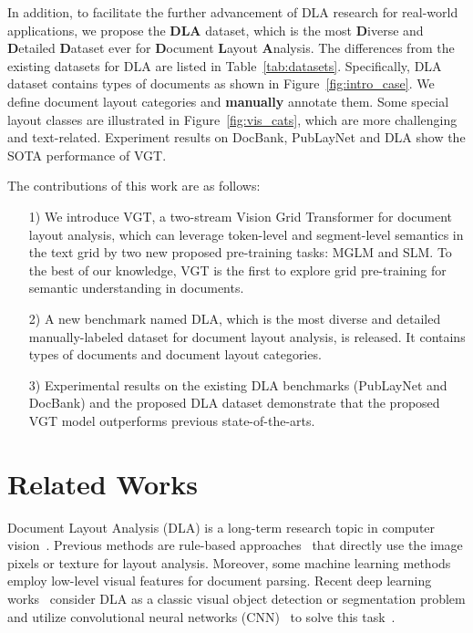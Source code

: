 \documentclass[10pt,twocolumn,letterpaper]{article}
\begin{document}
In addition, to facilitate the further advancement of DLA research for real-world applications, we propose the \textbf{DLA} dataset, which is the most \textbf{D}iverse and \textbf{D}etailed \textbf{D}ataset ever for \textbf{D}ocument \textbf{L}ayout \textbf{A}nalysis. 
The differences from the existing datasets for DLA are listed in Table~\ref{tab:datasets}.
Specifically, DLA dataset contains  types of documents as shown in Figure~\ref{fig:intro_case}.
We define  document layout categories and \textbf{manually} annotate them.
Some special layout classes are illustrated in Figure~\ref{fig:vis_cats}, which are more challenging and text-related.
Experiment results on DocBank, PubLayNet and DLA show the SOTA performance of VGT.

The contributions of this work are as follows:

\begin{itemize} \setlength{\itemsep}{0pt}
  \item[1)]  We introduce VGT, a two-stream Vision Grid Transformer for document layout analysis, which can leverage token-level and segment-level semantics in the text grid by two new proposed pre-training tasks: MGLM and SLM.
  To the best of our knowledge, VGT is the first to explore grid pre-training for  semantic understanding in documents.
  \item[2)]  A new benchmark named DLA, which is the most diverse and detailed manually-labeled dataset for document layout analysis, is released. It contains  types of documents and  document layout categories.
  \item[3)]  Experimental results on the existing DLA benchmarks (PubLayNet and DocBank) and the proposed DLA dataset demonstrate that the proposed VGT model outperforms previous state-of-the-arts.
\end{itemize}


\section{Related Works}
Document Layout Analysis (DLA) is a long-term research topic in computer vision~\cite{binmakhashen2019document}.
Previous methods are rule-based approaches~\cite{rule1,rule2} that directly use the image pixels or texture for layout analysis.
Moreover, some machine learning methods~\cite{ml1,ml2} employ low-level visual features for document parsing.
Recent deep learning works~\cite{schreiber2017deepdesrt,CascadeTabNet} consider DLA as a classic visual object detection or segmentation problem and utilize convolutional neural networks (CNN)~\cite{he2016deep} to solve this task~\cite{ren2015faster,liu2016ssd, redmon2018yolov3, he2017mask}.
\end{document}
